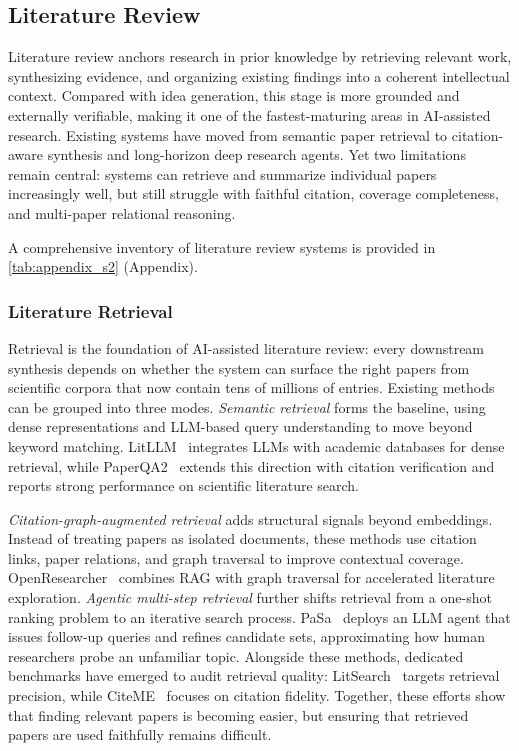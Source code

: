 \documentclass{llmxive}
\begin{document}
\vspace{8pt}



\subsection{Literature Review}
\label{sec:literature_review}

Literature review anchors research in prior knowledge by retrieving relevant work, synthesizing evidence, and organizing existing findings into a coherent intellectual context. Compared with idea generation, this stage is more grounded and externally verifiable, making it one of the fastest-maturing areas in AI-assisted research. Existing systems have moved from semantic paper retrieval to citation-aware synthesis and long-horizon deep research agents. Yet two limitations remain central: systems can retrieve and summarize individual papers increasingly well, but still struggle with faithful citation, coverage completeness, and multi-paper relational reasoning. 

A comprehensive inventory of literature review systems is provided in \cref{tab:appendix_s2} (Appendix).


\subsubsection{Literature Retrieval}
\label{sec:lit_retrieval}

Retrieval is the foundation of AI-assisted literature review: every downstream synthesis depends on whether the system can surface the right papers from scientific corpora that now contain tens of millions of entries. Existing methods can be grouped into three modes. \emph{Semantic retrieval} forms the baseline, using dense representations and LLM-based query understanding to move beyond keyword matching. LitLLM~\cite{agarwal2024litllm} integrates LLMs with academic databases for dense retrieval, while PaperQA2~\cite{skarlinski2024paperqa2} extends this direction with citation verification and reports strong performance on scientific literature search.

\emph{Citation-graph-augmented retrieval} adds structural signals beyond embeddings. Instead of treating papers as isolated documents, these methods use citation links, paper relations, and graph traversal to improve contextual coverage. OpenResearcher~\cite{li2024openresearcher} combines RAG with graph traversal for accelerated literature exploration. \emph{Agentic multi-step retrieval} further shifts retrieval from a one-shot ranking problem to an iterative search process. PaSa~\cite{pasa2025} deploys an LLM agent that issues follow-up queries and refines candidate sets, approximating how human researchers probe an unfamiliar topic. Alongside these methods, dedicated benchmarks have emerged to audit retrieval quality: LitSearch~\cite{litsearch2024} targets retrieval precision, while CiteME~\cite{citeme2024} focuses on citation fidelity. Together, these efforts show that finding relevant papers is becoming easier, but ensuring that retrieved papers are used faithfully remains difficult.
\end{document}
